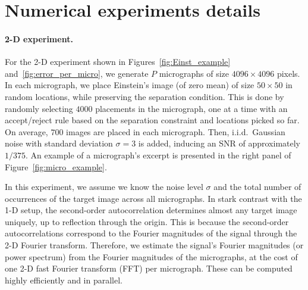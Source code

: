 \documentclass[9pt,twocolumn,twoside,lineno]{pnas-new}
\begin{document}



\appendix

\section{Numerical experiments details} \label{sec:numeric_details}

\paragraph{2-D experiment.}

For the 2-D experiment shown in Figures~\ref{fig:Einst_example} and~\ref{fig:error_per_micro}, we generate $P$ micrographs of size $4096\times 4096$ pixels. 
In each micrograph, we place Einstein's image (of zero mean) of size $50\times 50$  in random locations, while preserving the separation condition.%
This is done by randomly selecting $4000$ placements in the micrograph, one at a time with
an accept/reject rule based on the separation constraint and locations picked so far.
On average, $700$ images are placed in each micrograph.   
Then, i.i.d.\ Gaussian noise with standard deviation $\sigma=3$ is added, inducing an SNR of approximately $1/375$.
An example of a micrograph's excerpt is presented in the right panel of Figure~\ref{fig:micro_example}.


In this experiment, we assume we know the noise level $\sigma$ and the total number of occurrences of the target image across all micrographs.
In stark contrast with the 1-D setup, the second-order autocorrelation determines almost any target image uniquely, up to reflection through the origin. This is because the second-order autocorrelations correspond to the Fourier magnitudes of the signal through the 2-D Fourier transform. 
Therefore, we estimate the signal's Fourier magnitudes (or power spectrum) from the Fourier magnitudes of the micrographs, at the cost of one 2-D fast Fourier transform (FFT) per micrograph. These can be computed highly efficiently and in parallel.
\end{document}

